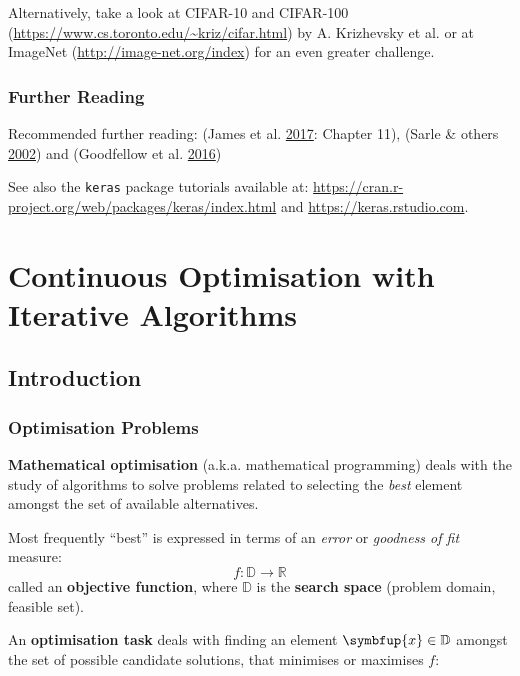 \documentclass[10pt,b5paper,krantz1]{krantz}
\renewcommand{\mathbf}[1]{\symbfup{#1}}
\begin{document}
Alternatively, take a look at CIFAR-10 and CIFAR-100 (\url{https://www.cs.toronto.edu/~kriz/cifar.html})
by A. Krizhevsky et al.
or at ImageNet (\url{http://image-net.org/index}) for an even greater challenge.

\hypertarget{further-reading-4}{%
\subsection{Further Reading}\label{further-reading-4}}

Recommended further reading: (James et al. \protect\hyperlink{ref-islr}{2017}: Chapter 11), (Sarle \& others \protect\hyperlink{ref-aifaq}{2002}) and (Goodfellow et al. \protect\hyperlink{ref-deeplearn}{2016})

See also the \texttt{keras} package tutorials available at:
\url{https://cran.r-project.org/web/packages/keras/index.html}
and \url{https://keras.rstudio.com}.

\hypertarget{continuous-optimisation-with-iterative-algorithms}{%
\chapter{Continuous Optimisation with Iterative Algorithms}\label{continuous-optimisation-with-iterative-algorithms}}

\hypertarget{introduction-10}{%
\section{Introduction}\label{introduction-10}}

\hypertarget{optimisation-problems}{%
\subsection{Optimisation Problems}\label{optimisation-problems}}

\textbf{Mathematical optimisation} (a.k.a. mathematical programming)
deals with the study of algorithms to solve problems related
to selecting the \emph{best} element amongst the set of available alternatives.

Most frequently ``best'' is expressed in terms
of an \emph{error} or \emph{goodness of fit} measure:
\[
f:\mathbb{D}\to\mathbb{R}
\]
called an \textbf{objective function}, where
\(\mathbb{D}\) is the \textbf{search space} (problem domain, feasible set).

An \textbf{optimisation task} deals with finding an element \(\mathbf{x}\in \mathbb{D}\)
amongst the set of possible candidate solutions,
that minimises or maximises \(f\):
\end{document}
